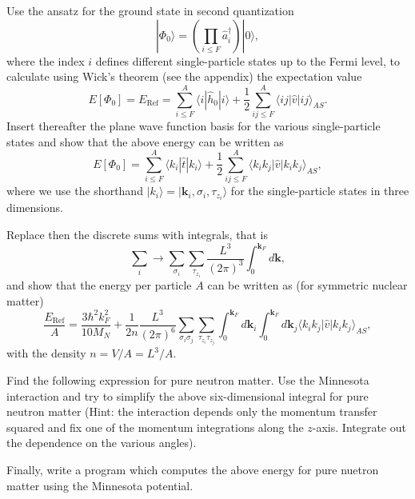 \begin{prob}\label{problem:referenceE}
Use the ansatz for the ground state in second quantization 
\[
|\Phi_0\rangle = \left(\prod_{i\le F}\hat{a}_{i}^{\dagger}\right)|0\rangle,
\]
where the index $i$ defines different single-particle states up to the Fermi level, to calculate using Wick's theorem (see the appendix)
the expectation value
\[
  E[\Phi_0]= E_{\mathrm{Ref}}= \sum_{i\le F}^A \langle i | \hat{h}_0 | i \rangle +
  \frac{1}{2}\sum_{ij\le F}^A\langle ij|\hat{v}|ij\rangle_{AS}.
\]
Insert thereafter the plane wave function basis for the various single-particle states and show that the above energy can be written as 
\[
  E[\Phi_0] = \sum_{i\le F}^A \langle k_i | \hat{t} | k_i \rangle +
  \frac{1}{2}\sum_{ij\le F}^A\langle k_ik_j|\hat{v}|k_ik_j\rangle_{AS},
\]
where we use the shorthand $\vert k_i\rangle = \vert \mathbf{k}_i,\sigma_i,\tau_{z_i}\rangle$ for the single-particle states in three dimensions. 

Replace then the discrete sums with integrals, that is
\[
\sum_i \rightarrow \sum_{\sigma_i}\sum_{\tau_{z_i}}\frac{L^3}{(2\pi)^3}\int_0^{\mathbf{k}_F}d\mathbf{k},
\]
and show that the energy per particle $A$ can be written as (for symmetric nuclear matter)
\[
  \frac{E_{\mathrm{Ref}}}{A}=\frac{3\hbar^2k_F^2}{10M_N}+\frac{1}{2n}\frac{L^3}{(2\pi)^6}\sum_{\sigma_i\sigma_j}\sum_{\tau_{z_i}\tau_{z_j}}\int_0^{\mathbf{k}_F}d\mathbf{k}_i\int_0^{\mathbf{k}_F}d\mathbf{k}_j\langle k_ik_j|\hat{v}|k_ik_j\rangle_{AS},
\]
with the density $n=V/A=L^3/A$. 

Find the following expression for pure neutron matter. Use the Minnesota interaction and try to simplify the above six-dimensional integral for pure neutron matter (Hint: the interaction depends only the momentum transfer squared and fix one of the momentum integrations along the $z$-axis. Integrate out the dependence on the various angles).  

Finally, write a program which computes the above energy for pure nuetron matter using the Minnesota potential. 
\end{prob}

